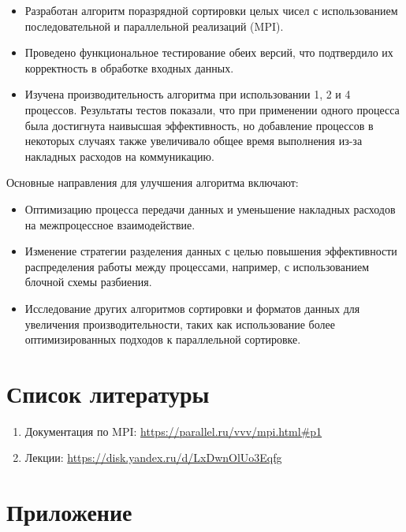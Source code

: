 \documentclass[12pt]{article}
\begin{document}
\begin{itemize}
    \item Разработан алгоритм поразрядной сортировки целых чисел с использованием последовательной и параллельной реализаций (MPI).
    
    \item Проведено функциональное тестирование обеих версий, что подтвердило их корректность в обработке входных данных.
    
    \item Изучена производительность алгоритма при использовании 1, 2 и 4 процессов. Результаты тестов показали, что при применении одного процесса была достигнута наивысшая эффективность, но добавление процессов в некоторых случаях также увеличивало общее время выполнения из-за накладных расходов на коммуникацию.
\end{itemize}

Основные направления для улучшения алгоритма включают:

\begin{itemize}
    \item Оптимизацию процесса передачи данных и уменьшение накладных расходов на межпроцессное взаимодействие.
    
    \item Изменение стратегии разделения данных с целью повышения эффективности распределения работы между процессами, например, с использованием блочной схемы разбиения.
    
    \item Исследование других алгоритмов сортировки и форматов данных для увеличения производительности, таких как использование более оптимизированных подходов к параллельной сортировке.
\end{itemize}


\section{Список литературы}
\begin{enumerate}
    \item Документация по MPI: \url{https://parallel.ru/vvv/mpi.html#p1}
    \item Лекции: \url{https://disk.yandex.ru/d/LxDwnOlUo3Eqfg}
\end{enumerate}
\appendix
\section*{Приложение}
\end{document}
